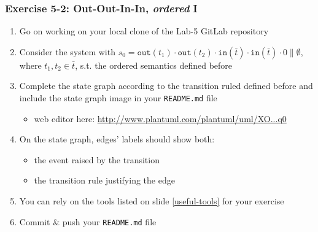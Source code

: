 \documentclass[handout]{beamer}\mode<presentation>{\usetheme{AMSCesenaBleu}}
\begin{document}
\begin{frame}
\frametitle{Exercise 5-2: Out-Out-In-In, \emph{ordered} I}
    \begin{enumerate}
        \item Go on working on your local clone of the Lab-5 GitLab repository
        
        \vfill
        
        \item Consider the system with \alert{$s_0 = \mathtt{out}(t_1) \cdot \mathtt{out}(t_2) \cdot \mathtt{in}(\bar t) \cdot \mathtt{in}(\bar t) \cdot 0  \parallel \emptyset$}, where $t_1, t_2 \in \bar{t}$, s.t. the \alert{ordered} \linda{} semantics defined before
        
        \vfill
    
        \item Complete the state graph according to the transition ruled defined before and include the state graph image in your \alert{\texttt{README.md}} file
        \begin{itemize}
            \item web editor here: \href{
                http://www.plantuml.com/plantuml/uml/XO_1IiD048RlynHpR8MMjCTIacBLenvgJxM79JlMePlTi3khHl5WKV15V1kVeazYQeH627XOzeV__pwOMH3b9HO6mfPjgRmgy8nkLJHouQmi-8bmdBJAXIYXdqegGyYY3EUXcxvK1U7SHS_auOur8HMbLAWfv9vBOMUXHOQ36fy1yLJbsurtqUgvCyvFf-TMizsaAJh3zzIrM5fwBEj4kbvLP8nxW1U0rSaQ1uCKGmADFYGJT55wij-zzeU_QTSVikt9rzlnJt3_yLc_TmX9OnYrm1kxkbfUrsaDZRUf_x4TK0YZHZS-xhjqO_nxqmIpB8CPMHqBymq0
            }{http://www.plantuml.com/plantuml/uml/XO...q0}
        \end{itemize}
        
        \vfill
        
        \item On the state graph, edges' labels should show both:
        \begin{itemize}
            \item the event raised by the transition
            \item the transition rule justifying the edge
        \end{itemize}
        
        \vfill
        
        \item You can rely on the tools listed on slide \ref{useful-tools} for your exercise
        
        \vfill
        
        \item Commit \& push your \texttt{README.md} file
        
    \end{enumerate}
    
\end{frame}
\end{document}
